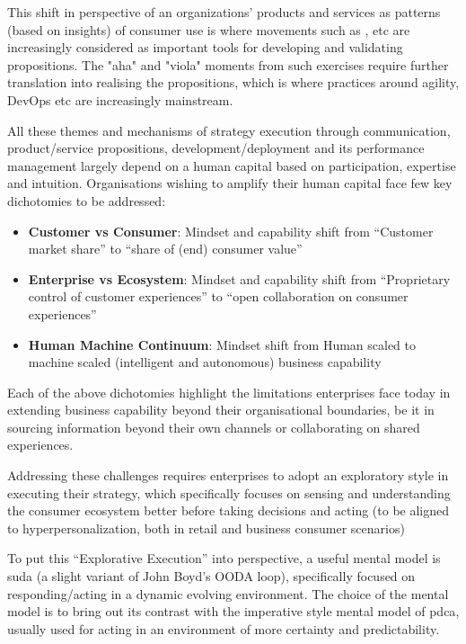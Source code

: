 This shift in perspective of an organizations’ products and services as patterns (based on insights) of consumer use
is where movements such as ,  etc are increasingly considered
as important tools for developing and validating propositions.
The "aha" and "viola" moments from such exercises require further translation into realising the propositions,
which is where practices around agility, DevOps etc are increasingly mainstream.

All these themes and mechanisms of strategy execution through communication, product/service propositions,
development/deployment and its performance management
largely depend on a human capital based on participation, expertise and intuition.
Organisations wishing to amplify their human capital face few key dichotomies to be addressed:

\begin{itemize}
    \item \textbf{Customer vs Consumer}: Mindset and capability shift from ``Customer market share'' to
          ``share of (end) consumer value''
    \item \textbf{Enterprise vs Ecosystem}: Mindset and capability shift from
          “Proprietary control of customer experiences” to “open collaboration on consumer experiences”
    \item \textbf{Human Machine Continuum}: Mindset shift from Human scaled to machine scaled
          (intelligent and autonomous) business capability
\end{itemize}
Each of the above dichotomies highlight the limitations enterprises face today in extending business capability
beyond their organisational boundaries, be it in sourcing information beyond their own channels or collaborating
on shared experiences.

Addressing these challenges requires enterprises to adopt an exploratory style in executing their strategy,
which specifically focuses on sensing and understanding the consumer ecosystem better before taking decisions
and acting (to be aligned to hyperpersonalization, both in retail and business consumer scenarios)

To put this “Explorative Execution” into perspective, a useful mental model is \gls{suda}
(a slight variant of John Boyd’s OODA loop),
specifically focused on responding/acting in a dynamic evolving environment.
The choice of the mental model is to bring out its contrast with the imperative style mental model of \gls{pdca},
usually used for acting in an environment of more certainty and predictability.

